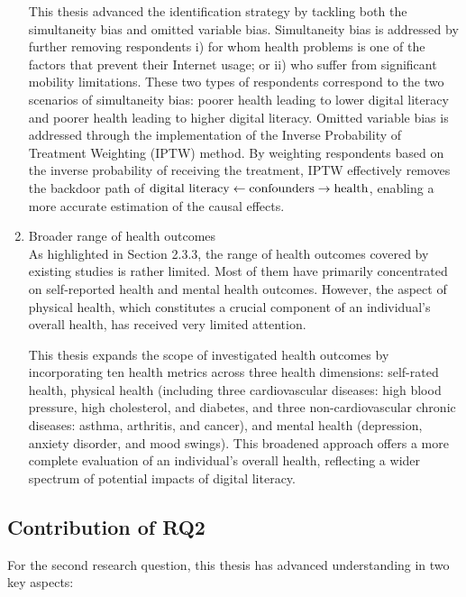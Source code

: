 \begin{enumerate}[wide=0pt, leftmargin=*, labelwidth=0pt, labelindent=\parindent, itemindent=0pt]
    This thesis advanced the identification strategy by tackling both the simultaneity bias and omitted variable bias. Simultaneity bias is addressed by further removing respondents i) for whom health problems is one of the factors that prevent their Internet usage; or ii) who suffer from significant mobility limitations. These two types of respondents correspond to the two scenarios of simultaneity bias: poorer health leading to lower digital literacy and poorer health leading to higher digital literacy. Omitted variable bias is addressed through the implementation of the Inverse Probability of Treatment Weighting (IPTW) method. By weighting respondents based on the inverse probability of receiving the treatment, IPTW effectively removes the backdoor path of $\textnormal{digital literacy} \leftarrow \textnormal{confounders} \rightarrow \textnormal{health}$, enabling a more accurate estimation of the causal effects.

    \item Broader range of health outcomes \\
    As highlighted in Section 2.3.3, the range of health outcomes covered by existing studies is rather limited. Most of them have primarily concentrated on self-reported health and mental health outcomes. However, the aspect of physical health, which constitutes a crucial component of an individual's overall health, has received very limited attention. 

    This thesis expands the scope of investigated health outcomes by incorporating ten health metrics across three health dimensions: self-rated health, physical health (including three cardiovascular diseases: high blood pressure, high cholesterol, and diabetes, and three non-cardiovascular chronic diseases: asthma, arthritis, and cancer), and mental health (depression, anxiety disorder, and mood swings). This broadened approach offers a more complete evaluation of an individual's overall health, reflecting a wider spectrum of potential impacts of digital literacy.
\end{enumerate}

\subsection{Contribution of RQ2}
For the second research question, this thesis has advanced understanding in two key aspects:

